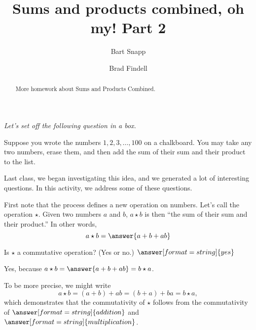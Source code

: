 \documentclass{ximera}
\title{Sums and products combined, oh my!  Part 2}
\author{Bart Snapp \and Brad Findell}
\begin{document}
\begin{abstract}
More homework about Sums and Products Combined. 
\end{abstract}
\maketitle

\emph{Let's set off the following question in a box.} 

Suppose you wrote the numbers $1,2,3,\dots,100$ on a chalkboard. You
may take any two numbers, erase them, and then add the sum of their
sum and their product to the list.

Last class, we began investigating this idea, and we generated a lot of interesting questions.  
In this activity, we address some of these questions.  

\begin{problem}
First note that the process defines a new operation on numbers.  Let's call the operation $\star$.  Given two numbers $a$ and $b$,  $a\star b$ is then ``the sum of their sum and their product.''    In other words, 
\[
a\star b = \answer{a+b+ab}
\]
\end{problem}

\begin{problem}
Is $\star$ a commutative operation?  (Yes or no.) $\answer[format=string]{yes}$

\begin{explanation}
Yes, because $a\star b = \answer{a+b+ab}  = b\star a$.  

\begin{question}
To be more precise, we might write 
\[
a\star b = (a+b)+ab= (b+a)+ba = b\star a,
\]
which demonstrates that the commutativity of $\star$ follows from the commutativity of 
$\answer[format=string]{addition}$ and $\answer[format=string]{multiplication}$. 
\end{question}
\end{explanation}
\end{problem}
\end{document}
